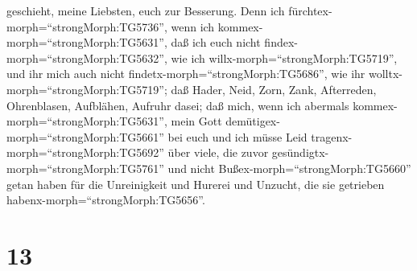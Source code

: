 geschieht, meine Liebsten, euch zur Besserung.  Denn ich
fürchtex-morph=``strongMorph:TG5736'', wenn ich
kommex-morph=``strongMorph:TG5631'', daß ich euch nicht
findex-morph=``strongMorph:TG5632'', wie ich
willx-morph=``strongMorph:TG5719'', und ihr mich auch nicht
findetx-morph=``strongMorph:TG5686'', wie ihr
wolltx-morph=``strongMorph:TG5719''; daß Hader, Neid, Zorn, Zank,
Afterreden, Ohrenblasen, Aufblähen, Aufruhr dasei;  daß
mich, wenn ich abermals kommex-morph=``strongMorph:TG5631'', mein Gott
demütigex-morph=``strongMorph:TG5661'' bei euch und ich müsse Leid
tragenx-morph=``strongMorph:TG5692'' über viele, die zuvor
gesündigtx-morph=``strongMorph:TG5761'' und nicht
Bußex-morph=``strongMorph:TG5660'' getan haben für die Unreinigkeit und
Hurerei und Unzucht, die sie getrieben
habenx-morph=``strongMorph:TG5656''.

\hypertarget{section-12}{%
\section{13}\label{section-12}}

